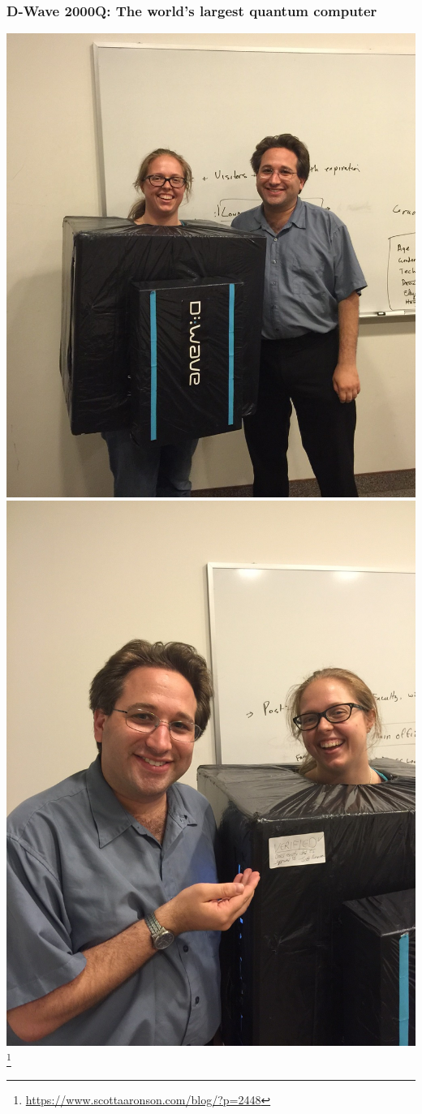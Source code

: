 \documentclass[]{beamer}
\begin{document}
\begin{frame}
\frametitle{D-Wave 2000Q: The world's largest quantum computer}

\begin{center}
\includegraphics[scale=0.15]{dwavecostume1}
\includegraphics[scale=0.1]{dwavecostume2}\footnote{\url{https://www.scottaaronson.com/blog/?p=2448}}

\end{center}
\end{frame}
\end{document}
